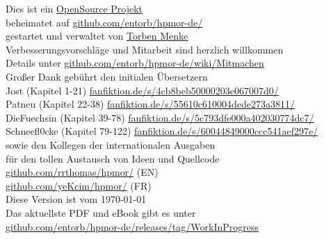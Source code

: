 \newpage
\begin{center}
\noindent
\vfill
Dies ist ein \href{https://github.com/entorb/hpmor-de/}{OpenSource Projekt}\\
beheimatet auf {\small\href{https://github.com/entorb/hpmor-de/}{github.com/entorb/hpmor-de/}}\\
gestartet und verwaltet von \href{https://entorb.net}{Torben Menke}\\

\vspace*{1\baselineskip}
Verbesserungsvorschläge und Mitarbeit sind herzlich willkommen\\
Details unter {\small\href{https://github.com/entorb/hpmor-de/wiki/Mitmachen}{github.com/entorb/hpmor-de/wiki/Mitmachen}}\\

\vspace*{1\baselineskip}
Großer Dank gebührt den initialen Übersetzern\\
Jost (Kapitel 1-21) {\small\href{https://www.fanfiktion.de/s/4cb8beb50000203e067007d0/}{fanfiktion.de/s/4cb8beb50000203e067007d0/}}\\
Patneu (Kapitel 22-38) {\small\href{https://www.fanfiktion.de/s/55610c610004dede273a3811/}{fanfiktion.de/s/55610c610004dede273a3811/}}\\
DieFuechsin (Kapitel 39-78) {\small\href{https://www.fanfiktion.de/s/5c793dfe000a402030774dc7/}{fanfiktion.de/s/5c793dfe000a402030774dc7/}}\\
Schneefl0cke (Kapitel 79-122) {\small\href{https://www.fanfiktion.de/s/60044849000ccc541aef297e/}{fanfiktion.de/s/60044849000ccc541aef297e/}}\\

\vspace*{1\baselineskip}
sowie den Kollegen der internationalen Ausgaben\\
für den tollen Austausch von Ideen und Quellcode\\
{\small\href{https://github.com/rrthomas/hpmor/}{github.com/rrthomas/hpmor/}} (EN)\\
{\small\href{https://github.com/yeKcim/hpmor/}{github.com/yeKcim/hpmor/}} (FR)\\

\vspace*{1\baselineskip}
Diese Version ist vom \today{}\\
Das aktuellste PDF und eBook gibt es unter\\
{\small\href{https://github.com/entorb/hpmor-de/releases/tag/WorkInProgress}{github.com/entorb/hpmor-de/releases/tag/WorkInProgress}}\\
\end{center}

